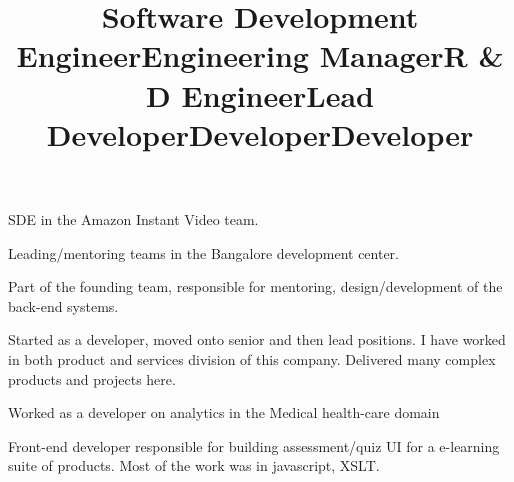 \begin{resume}
\title{Software Development Engineer}
\begin{position}
SDE in the Amazon Instant Video team.
\end{position}

\title{Engineering Manager}
\begin{position}
Leading/mentoring teams in the Bangalore development center. 
\end{position}


\title{R \& D Engineer}
\begin{position}
Part of the founding team, responsible for mentoring, design/development of the back-end systems. 
\end{position}


\title{Lead Developer}
\begin{position}
Started as a developer, moved onto senior and then lead positions. I have worked in both product and services division of this company. Delivered many complex products and projects here.
\end{position}

\title{Developer}
\begin{position}
Worked as a developer on analytics in the Medical health-care domain
\end{position}

\title{Developer}
\begin{position}
Front-end developer responsible  for building assessment/quiz UI for a e-learning suite of products. Most of the work was in javascript, XSLT. 
\end{position}







\end{resume}
